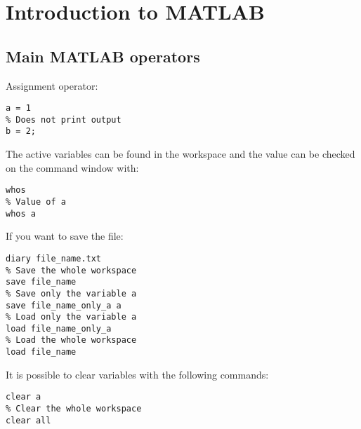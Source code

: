 \documentclass[12pt, a4paper]{report}
\newtheorem[style=M,bodystyle=\normalfont]{theorem}{Theorem}
\newtheorem[style=M,bodystyle=\normalfont]{corollary}{Corollary}
\newtheorem[style=M,bodystyle=\normalfont]{lemma}{Lemma}
\newtheorem[style=M,bodystyle=\normalfont]{definition}{Definition}
\begin{document}
\newpage

\tableofcontents

\newpage

\chapter{Introduction to MATLAB}
    \section{Main MATLAB operators}
    Assignment operator: 
    \begin{lstlisting}[frame=single, numbers=none, style=Matlab-bw]
% Print output
a = 1 
% Does not print output
b = 2;
    \end{lstlisting}
    The active variables can be found in the workspace and the value can be checked on the command window with: 
    \begin{lstlisting}[frame=single, numbers=none, style=Matlab-bw]
% Value of all variables
whos
% Value of a
whos a
    \end{lstlisting}
    If you want to save the file: 
    \begin{lstlisting}[frame=single, numbers=none, style=Matlab-bw]
% Save the command history
diary file_name.txt 
% Save the whole workspace
save file_name 
% Save only the variable a
save file_name_only_a a 
% Load only the variable a
load file_name_only_a 
% Load the whole workspace
load file_name 
    \end{lstlisting}
    It is possible to clear variables with the following commands: 
    \begin{lstlisting}[frame=single, numbers=none, style=Matlab-bw]
% Clear only the variable a
clear a 
% Clear the whole workspace
clear all 
    \end{lstlisting}
\end{document}
